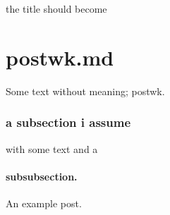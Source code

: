 \documentclass[a4paper,10pt]{scrbook}
\begin{document}
the title should become

\chapter{postwk.md}

Some text without meaning; postwk.

\hypertarget{a-subsection-i-assume}{%
\subsection{a subsection i assume}\label{a-subsection-i-assume}}

with some text and a

\hypertarget{subsubsection}{%
\subsubsection{subsubsection.}\label{subsubsection}}

An example post.


\printindex
\end{document}
